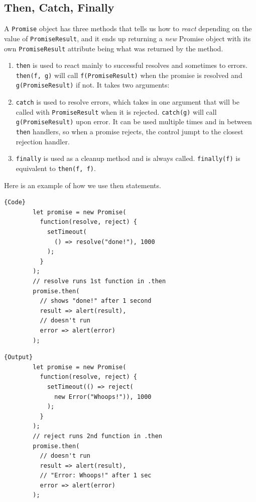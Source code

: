 \documentclass{article}
\begin{document}
  \subsection{Then, Catch, Finally}

    A \texttt{Promise} object has three methods that tells us how to \textit{react} depending on the value of \texttt{PromiseResult}, and it ends up returning a \textit{new} Promise object with its own \texttt{PromiseResult} attribute being what was returned by the method. 
    \begin{enumerate}
      \item \texttt{then} is used to react mainly to successful resolves and sometimes to errors. \texttt{then(f, g)} will call \texttt{f(PromiseResult)} when the promise is resolved and \texttt{g(PromiseResult)} if not. 
        It takes two arguments: 

      \item \texttt{catch} is used to resolve errors, which takes in one argument that will be called with \texttt{PromiseResult} when it is rejected. \texttt{catch(g)} will call \texttt{g(PromiseResult)} upon error. It can be used multiple times and in between \texttt{then} handlers, so when a promise rejects, the control jumpt to the closest rejection handler. 

      \item \texttt{finally} is used as a cleanup method and is always called. \texttt{finally(f)} is equivalent to \texttt{then(f, f)}.  
    \end{enumerate}


    \begin{example}
      Here is an example of how we use then statements. 
      
      \noindent\begin{minipage}{.5\textwidth}
      \begin{lstlisting}[]{Code}
        let promise = new Promise(
          function(resolve, reject) {
            setTimeout(
              () => resolve("done!"), 1000
            );
          }
        );
        // resolve runs 1st function in .then
        promise.then(
          // shows "done!" after 1 second
          result => alert(result), 
          // doesn't run
          error => alert(error) 
        );
      \end{lstlisting}
      \end{minipage}
      \hfill
      \begin{minipage}{.49\textwidth}
      \begin{lstlisting}[]{Output}
        let promise = new Promise(
          function(resolve, reject) {
            setTimeout(() => reject(
              new Error("Whoops!")), 1000
            );
          }
        );
        // reject runs 2nd function in .then
        promise.then(
          // doesn't run
          result => alert(result), 
          // "Error: Whoops!" after 1 sec 
          error => alert(error) 
        ); 
      \end{lstlisting}
      \end{minipage}
    \end{example}
\end{document}
